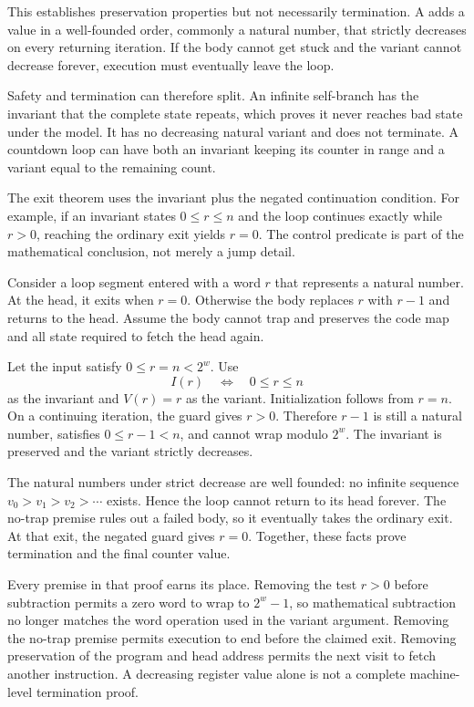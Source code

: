 This establishes preservation properties but not necessarily termination. A
 adds a value in a well-founded order, commonly a natural
number, that strictly decreases on every returning iteration. If the body
cannot get stuck and the variant cannot decrease forever, execution must
eventually leave the loop.

Safety and termination can therefore split. An infinite self-branch has the
invariant that the complete state repeats, which proves it never reaches bad
state under the model. It has no decreasing natural variant and does not
terminate. A countdown loop can have both an invariant keeping its counter in
range and a variant equal to the remaining count.

The exit theorem uses the invariant plus the negated continuation condition.
For example, if an invariant states \(0\leq r\leq n\) and the loop continues
exactly while \(r>0\), reaching the ordinary exit yields \(r=0\). The
control predicate is part of the mathematical conclusion, not merely a jump
detail.

\begin{example}[title={A complete countdown argument}]
Consider a loop segment entered with a word \(r\) that represents a natural
number. At the head, it exits when \(r=0\). Otherwise the body replaces \(r\)
with \(r-1\) and returns to the head. Assume the body cannot trap and preserves
the code map and all state required to fetch the head again.

Let the input satisfy \(0\leq r=n<2^w\). Use
\[
 I(r) \quad\Longleftrightarrow\quad 0\leq r\leq n
\]
as the invariant and \(V(r)=r\) as the variant. Initialization follows from
\(r=n\). On a continuing iteration, the guard gives \(r>0\). Therefore
\(r-1\) is still a natural number, satisfies \(0\leq r-1<n\), and cannot wrap
modulo \(2^w\). The invariant is preserved and the variant strictly decreases.

The natural numbers under strict decrease are well founded: no infinite
sequence \(v_0>v_1>v_2>\cdots\) exists. Hence the loop cannot return to its
head forever. The no-trap premise rules out a failed body, so it eventually
takes the ordinary exit. At that exit, the negated guard gives \(r=0\).
Together, these facts prove termination and the final counter value.
\end{example}

Every premise in that proof earns its place. Removing the test \(r>0\) before
subtraction permits a zero word to wrap to \(2^w-1\), so mathematical
subtraction no longer matches the word operation used in the variant argument.
Removing the no-trap premise permits execution to end before the claimed exit.
Removing preservation of the program and head address permits the next visit
to fetch another instruction. A decreasing register value alone is not a
complete machine-level termination proof.

